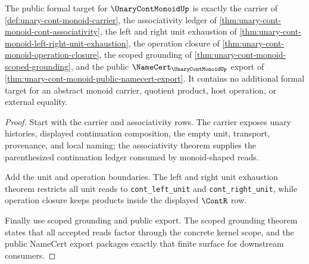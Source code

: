 \begin{theorem}
\label{thm:unary-cont-monoid-public-formal-target}
The public formal target for $\UnaryContMonoidUp$ is exactly the carrier of \autoref{def:unary-cont-monoid-carrier}, the associativity ledger of \autoref{thm:unary-cont-monoid-cont-associativity}, the left and right unit exhaustion of \autoref{thm:unary-cont-monoid-left-right-unit-exhaustion}, the operation closure of \autoref{thm:unary-cont-monoid-operation-closure}, the scoped grounding of \autoref{thm:unary-cont-monoid-scoped-grounding}, and the public $\NameCert_{\UnaryContMonoidUp}$ export of \autoref{thm:unary-cont-monoid-public-namecert-export}. It contains no additional formal target for an abstract monoid carrier, quotient product, host operation, or external equality.
\end{theorem}
\begin{proof}
Start with the carrier and associativity rows. The carrier exposes unary histories, displayed continuation composition, the empty unit, transport, provenance, and local naming; the associativity theorem supplies the parenthesized continuation ledger consumed by monoid-shaped reads.

Add the unit and operation boundaries. The left and right unit exhaustion theorem restricts all unit reads to \texttt{cont\_left\_unit} and \texttt{cont\_right\_unit}, while operation closure keeps products inside the displayed $\ContR$ row.

Finally use scoped grounding and public export. The scoped grounding theorem states that all accepted reads factor through the concrete kernel scope, and the public NameCert export packages exactly that finite surface for downstream consumers.
\end{proof}

